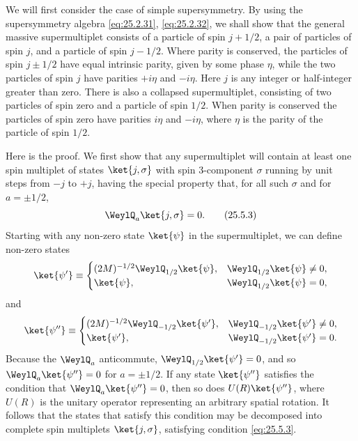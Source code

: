 We will first consider the case of simple supersymmetry. By using the
supersymmetry algebra \eqref{eq:25.2.31}, \eqref{eq:25.2.32}, we shall show
that the general massive supermultiplet consists of a particle of spin
$j+1/2$, a pair of particles of spin $j$, and a particle of spin $j-1/2$.
Where parity is conserved, the particles of spin $j\pm1/2$ have equal
intrinsic parity, given by some phase $\eta$, while the two particles of spin
$j$ have parities $+i\eta$ and $-i\eta$. Here $j$ is any integer or
half-integer greater than zero. There is also a collapsed supermultiplet,
consisting of two particles of spin zero and a particle of spin $1/2$. When
parity is conserved the particles of spin zero have parities $i\eta$ and
$-i\eta$, where $\eta$ is the parity of the particle of spin $1/2$.

Here is the proof. We first show that any supermultiplet will contain at least
one spin multiplet of states $\ket{j,\sigma}$ with spin 3-component $\sigma$
running by unit steps from $-j$ to $+j$, having the special property that, for
all such $\sigma$ and for $a=\pm1/2$,
\begin{equation}
 \WeylQ_a\ket{j,\sigma}=0.
\tag{25.5.3}\label{eq:25.5.3}
\end{equation}
Starting with any non-zero state $\ket{\psi}$ in the supermultiplet, we can
define non-zero states
\[
 \ket{\psi'}\equiv
 \begin{cases}
 (2M)^{-1/2}\WeylQ_{1/2}\ket{\psi},
   &\WeylQ_{1/2}\ket{\psi}\ne0,\\
 \ket{\psi},
   &\WeylQ_{1/2}\ket{\psi}=0,
 \end{cases}
\]
and
\[
 \ket{\psi''}\equiv
 \begin{cases}
 (2M)^{-1/2}\WeylQ_{-1/2}\ket{\psi'},
   &\WeylQ_{-1/2}\ket{\psi'}\ne0,\\
 \ket{\psi'},
   &\WeylQ_{-1/2}\ket{\psi'}=0.
 \end{cases}
\]
Because the $\WeylQ_a$ anticommute, $\WeylQ_{1/2}\ket{\psi'}=0$, and so
$\WeylQ_a\ket{\psi''}=0$ for $a=\pm1/2$. If any state $\ket{\psi''}$
satisfies the condition that $\WeylQ_a\ket{\psi''}=0$, then so does
$U(R)\ket{\psi''}$, where $U(R)$ is the unitary operator representing an
arbitrary spatial rotation. It follows that the states that satisfy this
condition may be decomposed into complete spin multiplets $\ket{j,\sigma}$,
satisfying condition \eqref{eq:25.5.3}.

